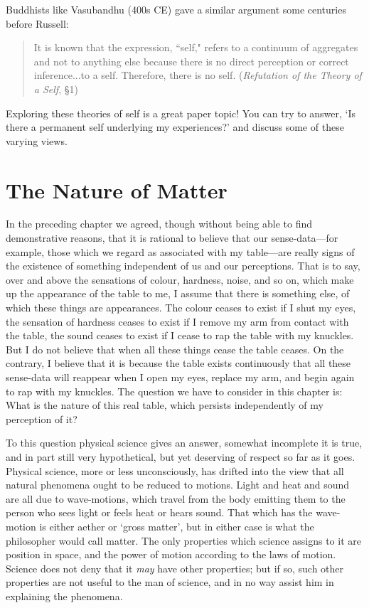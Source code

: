 \documentclass[oneside,letterpaper,12pt]{book}
\begin{document}
Buddhists like Vasubandhu (400s CE) gave a similar argument some centuries before Russell:
\begin{quote}
	It is known that the expression, ``self," refers to a continuum of aggregates and not to anything else because there is no direct perception or correct inference...to a self. Therefore, there is no self. (\textit{Refutation of the Theory of a Self}, \S1)
\end{quote}
Exploring these theories of self is a great paper topic! You can try to answer, `Is there a permanent self underlying my experiences?' and discuss some of these varying views.

\hypertarget{chapter-iii.-the-nature-of-matter}{%
\chapter{The Nature of Matter}\label{chapter-iii.-the-nature-of-matter}}

In the preceding chapter we agreed, though without being able to find
demonstrative reasons, that it is rational to believe that our
sense-data---for example, those which we regard as associated with my
table---are really signs of the existence of something independent of us
and our perceptions. That is to say, over and above the sensations of
colour, hardness, noise, and so on, which make up the appearance of the
table to me, I assume that there is something else, of which these
things are appearances. The colour ceases to exist if I shut my eyes,
the sensation of hardness ceases to exist if I remove my arm from
contact with the table, the sound ceases to exist if I cease to rap the
table with my knuckles. But I do not believe that when all these things
cease the table ceases. On the contrary, I believe that it is because
the table exists continuously that all these sense-data will reappear
when I open my eyes, replace my arm, and begin again to rap with my
knuckles. The question we have to consider in this chapter is: What is
the nature of this real table, which persists independently of my
perception of it?

To this question physical science gives an answer, somewhat incomplete
it is true, and in part still very hypothetical, but yet deserving of
respect so far as it goes. Physical science, more or less unconsciously,
has drifted into the view that all natural phenomena ought to be reduced
to motions. Light and heat and sound are all due to wave-motions, which
travel from the body emitting them to the person who sees light or feels
heat or hears sound. That which has the wave-motion is either aether or
`gross matter', but in either case is
what the philosopher would call matter. The only properties which
science assigns to it are position in space, and the power of motion
according to the laws of motion. Science does not deny that it
\emph{may} have other properties; but if so, such other properties are
not useful to the man of science, and in no way assist him in explaining
the phenomena.
\end{document}

